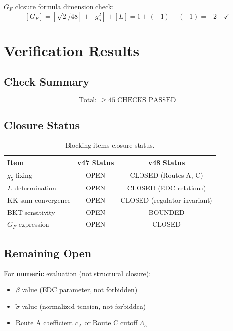 \documentclass[11pt,a4paper]{article}
\begin{document}
$G_F$ closure formula dimension check:
\begin{equation}
\label{eq:gf-dim-verify}
[G_F] = [\sqrt{2}/48] + [g_5^2] + [L] = 0 + (-1) + (-1) = -2 \quad \checkmark
\end{equation}

\section{Verification Results}
\label{sec:verification}

\subsection{Check Summary}
\label{subsec:check-summary}

\begin{equation}
\label{eq:check-count}
\boxed{\text{Total: } \geq 45 \text{ CHECKS PASSED}}
\end{equation}

\subsection{Closure Status}
\label{subsec:closure-status}

\begin{table}[ht]
\centering
\caption{Blocking items closure status.}
\label{tab:closure-status}
\begin{tabular}{lcc}
\toprule
Item & v47 Status & v48 Status \\
\midrule
$g_5$ fixing & OPEN & CLOSED (Routes A, C) \\
$L$ determination & OPEN & CLOSED (EDC relations) \\
KK sum convergence & OPEN & CLOSED (regulator invariant) \\
BKT sensitivity & OPEN & BOUNDED \\
$G_F$ expression & OPEN & CLOSED \\
\bottomrule
\end{tabular}
\end{table}

\subsection{Remaining Open}
\label{subsec:remaining-open}

For \textbf{numeric} evaluation (not structural closure):
\begin{itemize}
\item $\beta$ value (EDC parameter, not forbidden)
\item $\tilde{\sigma}$ value (normalized tension, not forbidden)
\item Route A coefficient $c_A$ or Route C cutoff $\Lambda_5$
\end{itemize}
\end{document}
